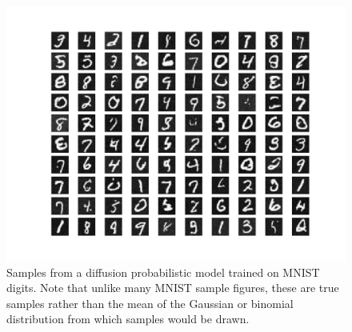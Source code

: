 \documentclass{article}
\begin{document}
\setcounter{figure}{0} \renewcommand{\thefigure}{App.\arabic{figure}}
\setcounter{table}{0} \renewcommand{\thetable}{App.\arabic{table}}
\begin{figure}
\centering
\includegraphics[width=0.8\linewidth]{MNIST_samples.pdf} 
\caption{
Samples from a diffusion probabilistic model trained on MNIST digits. 
Note that unlike many MNIST sample figures, these are true samples rather than the mean of the Gaussian or binomial distribution from which samples would be drawn.
}
\label{fig mnist}
\end{figure}
\end{document}
